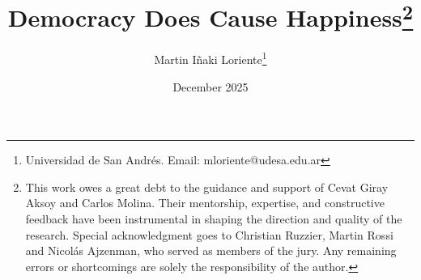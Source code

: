 \documentclass[11pt]{article}
\begin{document}
\renewcommand\thefootnote{\fnsymbol{footnote}}
\begin{titlepage}
	
	\title{\textbf{Democracy Does Cause Happiness}\footnote{This work owes a great debt to the guidance and support of Cevat Giray Aksoy and Carlos Molina. Their mentorship, expertise, and constructive feedback have been instrumental in shaping the direction and quality of the research. Special acknowledgment goes to Christian Ruzzier, Martin Rossi and Nicolás Ajzenman, who served as members of the jury. Any remaining errors or shortcomings are solely the responsibility of the author.}}
	
	\normalsize
	
	\bigskip
	
	\renewcommand{\thefootnote}{\arabic{footnote}}
	\addtocounter{footnote}{+2}
	
	\bigskip
	
	\author{\Large{Martin Iñaki Loriente}\thanks{Universidad de San Andrés. Email: mloriente@udesa.edu.ar}\qquad \vspace{5mm}}
	
	\vspace{5mm}
	
	\date{\vspace{5mm} December 2025}
	
	\singlespacing
	\clearpage\maketitle
	\thispagestyle{empty}
	
	\vspace{3mm}
	

\end{titlepage}
\end{document}
